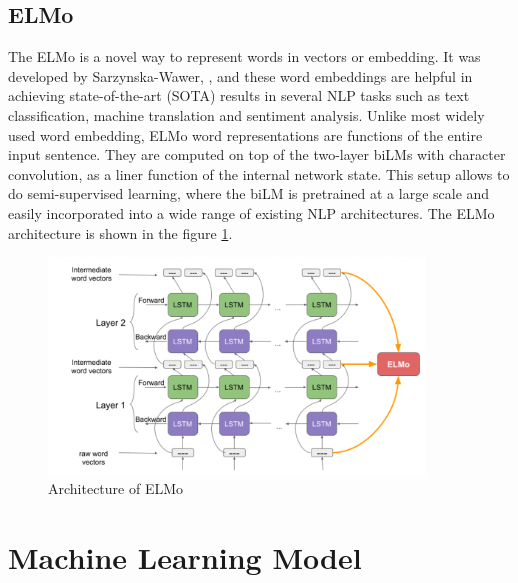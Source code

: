 \subsection{ELMo}
The ELMo is a novel way to represent words in vectors or embedding. It was developed by Sarzynska-Wawer, \cite{sarzynska2021detecting}, and these word embeddings are helpful in achieving state-of-the-art (SOTA) results in several NLP tasks such as text classification, machine translation and sentiment analysis.
Unlike most widely used word embedding, ELMo word representations are functions of the entire input sentence. They are computed on top of the two-layer biLMs with character convolution, as a liner function of the internal network state. This setup allows to do semi-supervised learning, where the biLM is pretrained at a large scale and easily incorporated into a wide range of existing NLP architectures. The ELMo architecture is shown in the figure \ref{fig:ELMo}.
\begin{figure}[H] 
	\centering 
	\vspace{20pt}\includegraphics[width=10cm]{images/ELMO.png}
	\caption{Architecture of ELMo}
	\label{fig:ELMo} 
\end{figure}
\section{Machine Learning Model}
